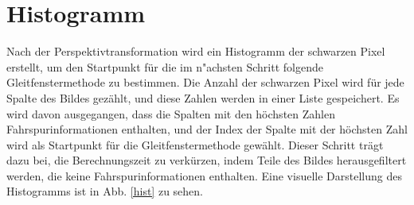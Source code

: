 \documentclass[arbeit=studie,oneside,BCOR=12mm]{ArbeitRST}
\begin{document}
\section{Histogramm}

Nach der Perspektivtransformation wird ein Histogramm der schwarzen Pixel
erstellt, um den Startpunkt für die im n"achsten Schritt folgende
Gleitfenstermethode zu bestimmen. Die Anzahl der schwarzen Pixel wird für jede
Spalte des Bildes gezählt, und diese Zahlen werden in einer Liste gespeichert.
Es wird davon ausgegangen, dass die Spalten mit den höchsten Zahlen
Fahrspurinformationen enthalten, und der Index der Spalte mit der höchsten Zahl
wird als Startpunkt für die Gleitfenstermethode gewählt. Dieser Schritt trägt
dazu bei, die Berechnungszeit zu verkürzen, indem Teile des Bildes
herausgefiltert werden, die keine Fahrspurinformationen enthalten. Eine
visuelle Darstellung des Histogramms ist in Abb. \ref{hist} zu sehen. \\
\end{document}
